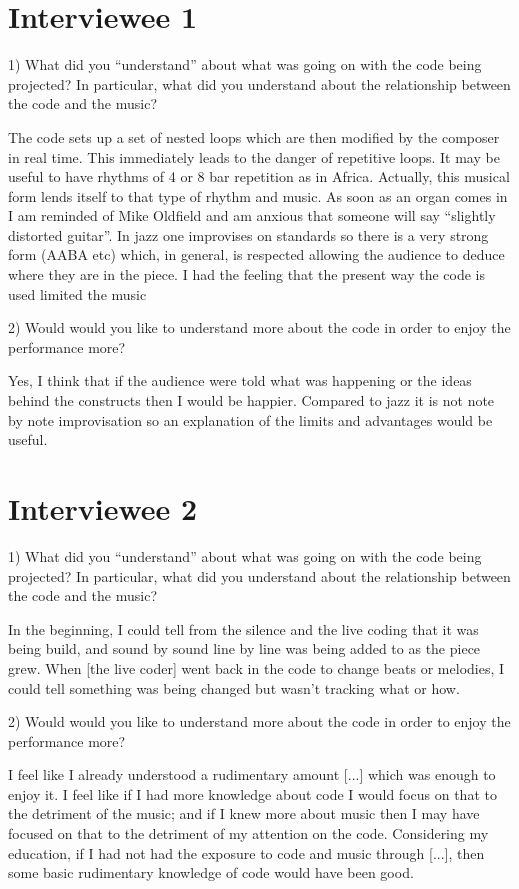 
\section*{Interviewee 1}
1) What did you ``understand'' about what was going on with the code being projected? In particular, what did you understand about the relationship between the code and the music?

The code sets up a set of nested loops which are then modified by the composer in real time. This immediately leads to the danger of repetitive loops. It may be useful to have rhythms of 4 or 8 bar repetition as in Africa. Actually, this musical form lends itself to that type of rhythm and music. As soon as an organ comes in I am reminded of Mike Oldfield and am anxious that someone will say “slightly distorted guitar”. In jazz one improvises on standards so there is a very strong form (AABA etc) which, in general, is respected allowing the audience to deduce where they are in the piece. I had the feeling that the present way the code is used limited the music

2) Would would you like to understand more about the code in order to enjoy the performance more?

Yes, I think that if the audience were told what was happening or the ideas behind the constructs then I would be happier. Compared to jazz it is not note by note improvisation so an explanation of the limits and advantages would be useful.

\section*{Interviewee 2}

1) What did you ``understand'' about what was going on with the code being projected? In particular, what did you understand about the relationship between the code and the music?

In the beginning, I could tell from the silence and the live coding that it was being build, and sound by sound line by line was being added to as the piece grew.  When [the live coder] went back in the code to change beats or melodies, I could tell something was being changed but wasn't tracking what or how.

2) Would would you like to understand more about the code in order to enjoy the performance more?

I feel like I already understood a rudimentary amount [...] which was enough to enjoy it.  I feel like if I had more knowledge about code I would focus on that to the detriment of the music; and if I knew more about music then I may have focused on that to the detriment of my attention on the code.  Considering my education, if I had not had the exposure to code and music through [...], then some basic rudimentary knowledge of code would have been good.

